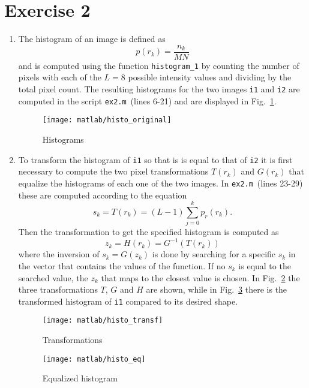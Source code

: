 \documentclass{article}
\newcommand{\includecode}[1]{}
\newcommand{\inlinecode}[1]{\lstinline[basicstyle=\ttfamily,keywordstyle={}]{#1}}
\begin{document}
\section*{Exercise 2}
\begin{enumerate}
\item The histogram of an image is defined as
  \[ p(r_k) = \frac{n_k}{MN} \]
  and is computed using the function \inlinecode{histogram_1} by
  counting the number of pixels with each of the $L=8$ possible
  intensity values and dividing by the total pixel count. The
  resulting histograms for the two images \inlinecode{i1} and
  \inlinecode{i2} are computed in the script \inlinecode{ex2.m}~(lines
  6-21) and are displayed in Fig.~\ref{plot:histo_original}.
  \begin{figure}[h]
    \centering
    \texttt{[image: matlab/histo\_original]}
    \caption{Histograms}
    \label{plot:histo_original}
  \end{figure}
\item To transform the histogram of \inlinecode{i1} so that is is
  equal to that of \inlinecode{i2} it is first necessary to compute
  the two pixel transformations $T(r_k)$ and $G(r_k)$ that equalize
  the histograms of each one of the two images. In
  \inlinecode{ex2.m}~(lines 23-29) these are computed according to the
  equation
  \[ s_k = T(r_k) = (L-1)\sum_{j=0}^kp_r(r_k) . \]
  Then the transformation to get the specified histogram is computed as
  \[ z_k = H(r_k) = G^{-1}(T(r_k)) \]
  where the inversion of $s_k = G(z_k)$ is done by searching for a
  specific $s_k$ in the vector that contains the values of the
  function. If no $s_k$ is equal to the searched value, the $z_k$ that
  maps to the closest value is chosen. In Fig.~\ref{plot:histo_transf}
  the three transformations $T$, $G$ and $H$ are shown, while in
  Fig.~\ref{plot:histo_eq} there is the transformed histogram of
  \inlinecode{i1} compared to its desired shape.
  \begin{figure}[h]
    \centering
    \texttt{[image: matlab/histo\_transf]}
    \caption{Transformations}
    \label{plot:histo_transf}
  \end{figure}
  \begin{figure}[h]
    \centering
    \texttt{[image: matlab/histo\_eq]}
    \caption{Equalized histogram}
    \label{plot:histo_eq}
  \end{figure}  
\end{enumerate}
\end{document}
